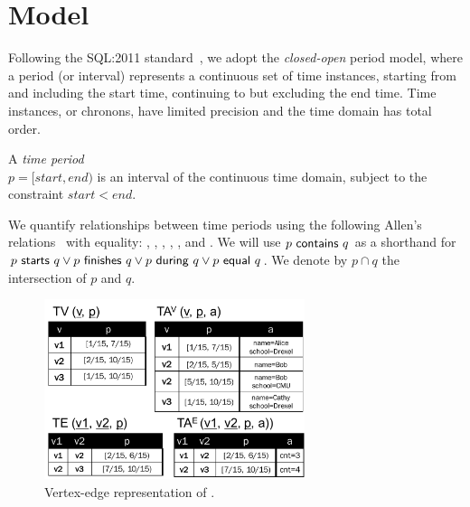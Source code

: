 \section{Model}
\label{sec:model}


Following the SQL:2011
standard~\cite{DBLP:journals/sigmod/KulkarniM12}, we adopt the {\em
  closed-open} period model, where a period (or interval) represents a
continuous set of time instances, starting from and including the
start time, continuing to but excluding the end time.  Time instances,
or chronons, have limited precision and the time domain has total
order.

\vspace{-0.2cm}
\begin{definition}
A {\em time period} \\$p = [start, end)$ is an interval of the
  continuous time domain, subject to the constraint $start < end$.
\label{def:period} 
\vspace{-0.2cm}
\end{definition}

We quantify relationships between time periods using the following
Allen's relations~\cite{allen83} with equality: ,
, , ,
, and .  We will use
$\pred{p}{contains}{q}$ as a shorthand for $\pred{p}{starts}{q} \vee
\pred{p}{finishes}{q} \vee \pred{p}{during}{q} \vee
\pred{p}{equal}{q}$.  We denote by $p \cap q$ the intersection of $p$
and $q$. \eat{$$to denote $[\predName{max}(p.start,q.start),
    \predName{min}(p.end, q.end))$.}

\begin{figure}[t!]
\centering
\includegraphics[width=3in]{figs/T1_rel.pdf}
\vspace{-0.2cm}
\caption{Vertex-edge representation of \tg {}.}
\vspace{-0.3cm}
\label{fig:tg_ve}
\end{figure}

